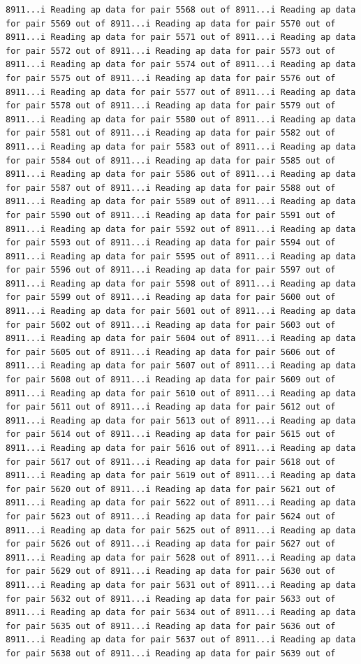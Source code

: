 \documentclass[
]{article}
\begin{document}
\begin{verbatim}
8911...i Reading ap data for pair 5568 out of 8911...i Reading ap data for pair 5569 out of 8911...i Reading ap data for pair 5570 out of 8911...i Reading ap data for pair 5571 out of 8911...i Reading ap data for pair 5572 out of 8911...i Reading ap data for pair 5573 out of 8911...i Reading ap data for pair 5574 out of 8911...i Reading ap data for pair 5575 out of 8911...i Reading ap data for pair 5576 out of 8911...i Reading ap data for pair 5577 out of 8911...i Reading ap data for pair 5578 out of 8911...i Reading ap data for pair 5579 out of 8911...i Reading ap data for pair 5580 out of 8911...i Reading ap data for pair 5581 out of 8911...i Reading ap data for pair 5582 out of 8911...i Reading ap data for pair 5583 out of 8911...i Reading ap data for pair 5584 out of 8911...i Reading ap data for pair 5585 out of 8911...i Reading ap data for pair 5586 out of 8911...i Reading ap data for pair 5587 out of 8911...i Reading ap data for pair 5588 out of 8911...i Reading ap data for pair 5589 out of 8911...i Reading ap data for pair 5590 out of 8911...i Reading ap data for pair 5591 out of 8911...i Reading ap data for pair 5592 out of 8911...i Reading ap data for pair 5593 out of 8911...i Reading ap data for pair 5594 out of 8911...i Reading ap data for pair 5595 out of 8911...i Reading ap data for pair 5596 out of 8911...i Reading ap data for pair 5597 out of 8911...i Reading ap data for pair 5598 out of 8911...i Reading ap data for pair 5599 out of 8911...i Reading ap data for pair 5600 out of 8911...i Reading ap data for pair 5601 out of 8911...i Reading ap data for pair 5602 out of 8911...i Reading ap data for pair 5603 out of 8911...i Reading ap data for pair 5604 out of 8911...i Reading ap data for pair 5605 out of 8911...i Reading ap data for pair 5606 out of 8911...i Reading ap data for pair 5607 out of 8911...i Reading ap data for pair 5608 out of 8911...i Reading ap data for pair 5609 out of 8911...i Reading ap data for pair 5610 out of 8911...i Reading ap data for pair 5611 out of 8911...i Reading ap data for pair 5612 out of 8911...i Reading ap data for pair 5613 out of 8911...i Reading ap data for pair 5614 out of 8911...i Reading ap data for pair 5615 out of 8911...i Reading ap data for pair 5616 out of 8911...i Reading ap data for pair 5617 out of 8911...i Reading ap data for pair 5618 out of 8911...i Reading ap data for pair 5619 out of 8911...i Reading ap data for pair 5620 out of 8911...i Reading ap data for pair 5621 out of 8911...i Reading ap data for pair 5622 out of 8911...i Reading ap data for pair 5623 out of 8911...i Reading ap data for pair 5624 out of 8911...i Reading ap data for pair 5625 out of 8911...i Reading ap data for pair 5626 out of 8911...i Reading ap data for pair 5627 out of 8911...i Reading ap data for pair 5628 out of 8911...i Reading ap data for pair 5629 out of 8911...i Reading ap data for pair 5630 out of 8911...i Reading ap data for pair 5631 out of 8911...i Reading ap data for pair 5632 out of 8911...i Reading ap data for pair 5633 out of 8911...i Reading ap data for pair 5634 out of 8911...i Reading ap data for pair 5635 out of 8911...i Reading ap data for pair 5636 out of 8911...i Reading ap data for pair 5637 out of 8911...i Reading ap data for pair 5638 out of 8911...i Reading ap data for pair 5639 out of 
\end{verbatim}
\end{document}
